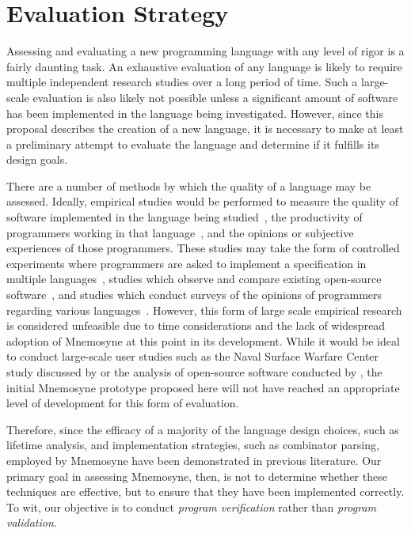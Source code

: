 \documentclass[11pt,a4paper]{article}
\theoremstyle{break}
\begin{document}
\vspace*{-.2in}
\section{Evaluation Strategy}
\label{sec:evaluate}
\vspace*{-.1in}

Assessing and evaluating a new programming language with any level of rigor is a fairly daunting task. An exhaustive evaluation of any language is likely to require multiple independent research studies over a long period of time. Such a large-scale evaluation is also likely not possible unless a significant amount of software has been implemented in the language being investigated. However, since this proposal describes the creation of a new language, it is necessary to make at least a preliminary attempt to evaluate the language and determine if it fulfills its design goals.

There are a number of methods by which the quality of a language may be assessed. Ideally, empirical studies would be performed to measure the quality of software implemented in the language being studied~\cite{Bhattacharya:2011:APL:1985793.1985817,Ray:2014:LSS:2635868.2635922}, the productivity of programmers working in that language~\cite{hudak1994haskell}, and the opinions or subjective experiences of those programmers. These studies may take the form of controlled experiments where programmers are asked to implement a specification in multiple languages~\cite{hudak1994haskell,Ray:2014:LSS:2635868.2635922}, studies which observe and compare existing open-source software~\cite{Ray:2014:LSS:2635868.2635922,Bhattacharya:2011:APL:1985793.1985817}, and studies which conduct surveys of the opinions of programmers regarding various languages~\cite{Ray:2014:LSS:2635868.2635922}. However, this form of large scale empirical research is considered unfeasible due to time considerations and the lack of widespread adoption of Mnemosyne at this point in its development. While it would be ideal to conduct large-scale user studies such as the Naval Surface Warfare Center study discussed by \citeauthor{hudak1994haskell} or the analysis of open-source software conducted by \citeauthor{Ray:2014:LSS:2635868.2635922}, the initial Mnemosyne prototype proposed here will not have reached an appropriate level of development for this form of evaluation.

Therefore, since the efficacy of a majority of the language design choices, such as lifetime analysis, and implementation strategies, such as combinator parsing, employed by Mnemosyne have been demonstrated in previous literature. Our primary goal in assessing Mnemosyne, then, is not to determine whether these techniques are effective, but to ensure that they have been implemented correctly. To wit, our objective is to conduct \textit{program verification} rather than \textit{program validation}.
\end{document}
